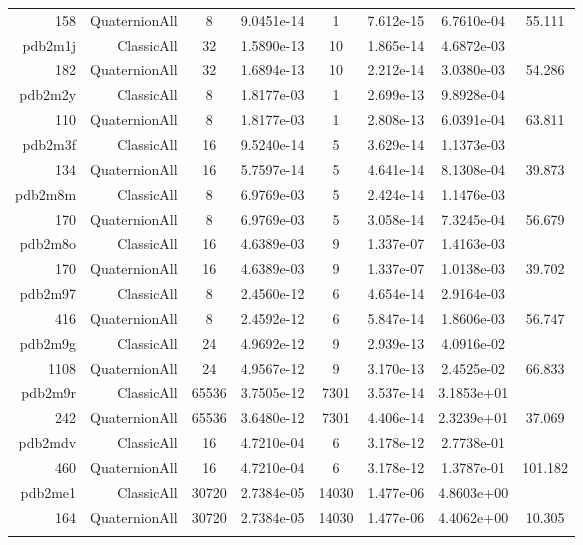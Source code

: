 \begin{xltabular}{\textwidth}{r|rcS[table-format=1.4e+2]cS[table-format=1.3e+2]S[table-format=1.4e+2]S[table-format=-1.3]}
158 & QuaternionAll & 8 & 9.0451e-14 & 1 & 7.612e-15 & 6.7610e-04 & 55.111\\  \addlinespace
pdb2m1j & ClassicAll & 32 & 1.5890e-13 & 10 & 1.865e-14 & 4.6872e-03 & \\
182 & QuaternionAll & 32 & 1.6894e-13 & 10 & 2.212e-14 & 3.0380e-03 & 54.286\\  \addlinespace
pdb2m2y & ClassicAll & 8 & 1.8177e-03 & 1 & 2.699e-13 & 9.8928e-04 & \\
110 & QuaternionAll & 8 & 1.8177e-03 & 1 & 2.808e-13 & 6.0391e-04 & 63.811\\  \addlinespace
pdb2m3f & ClassicAll & 16 & 9.5240e-14 & 5 & 3.629e-14 & 1.1373e-03 & \\
134 & QuaternionAll & 16 & 5.7597e-14 & 5 & 4.641e-14 & 8.1308e-04 & 39.873\\  \addlinespace
pdb2m8m & ClassicAll & 8 & 6.9769e-03 & 5 & 2.424e-14 & 1.1476e-03 & \\
170 & QuaternionAll & 8 & 6.9769e-03 & 5 & 3.058e-14 & 7.3245e-04 & 56.679\\  \addlinespace
pdb2m8o & ClassicAll & 16 & 4.6389e-03 & 9 & 1.337e-07 & 1.4163e-03 & \\
170 & QuaternionAll & 16 & 4.6389e-03 & 9 & 1.337e-07 & 1.0138e-03 & 39.702\\  \addlinespace
pdb2m97 & ClassicAll & 8 & 2.4560e-12 & 6 & 4.654e-14 & 2.9164e-03 & \\
416 & QuaternionAll & 8 & 2.4592e-12 & 6 & 5.847e-14 & 1.8606e-03 & 56.747\\  \addlinespace
pdb2m9g & ClassicAll & 24 & 4.9692e-12 & 9 & 2.939e-13 & 4.0916e-02 & \\
1108 & QuaternionAll & 24 & 4.9567e-12 & 9 & 3.170e-13 & 2.4525e-02 & 66.833\\  \addlinespace
pdb2m9r & ClassicAll & 65536 & 3.7505e-12 & 7301 & 3.537e-14 & 3.1853e+01 & \\
242 & QuaternionAll & 65536 & 3.6480e-12 & 7301 & 4.406e-14 & 2.3239e+01 & 37.069\\  \addlinespace
pdb2mdv & ClassicAll & 16 & 4.7210e-04 & 6 & 3.178e-12 & 2.7738e-01 & \\
460 & QuaternionAll & 16 & 4.7210e-04 & 6 & 3.178e-12 & 1.3787e-01 & 101.182\\  \addlinespace
pdb2me1 & ClassicAll & 30720 & 2.7384e-05 & 14030 & 1.477e-06 & 4.8603e+00 & \\
164 & QuaternionAll & 30720 & 2.7384e-05 & 14030 & 1.477e-06 & 4.4062e+00 & 10.305\\  \addlinespace

\end{xltabular}
